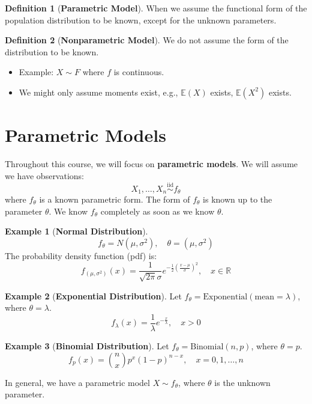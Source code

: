 \documentclass[12pt, a4paper]{article}
\theoremstyle{definition}
\newtheorem{definition}{Definition}
\newtheorem{example}{Example}
\newcommand{\R}{\mathbb{R}}
\newcommand{\E}{\mathbb{E}}
\newcommand{\iid}{\overset{\text{iid}}{\sim}}
\begin{document}
\begin{definition}[\textbf{Parametric Model}]
When we assume the functional form of the population distribution to be known, except for the unknown parameters.
\end{definition}

\begin{definition}[\textbf{Nonparametric Model}]
We do not assume the form of the distribution to be known.
\begin{itemize}
    \item Example: $X \sim F$ where $f$ is continuous.
    \item We might only assume moments exist, e.g., $\E(X)$ exists, $\E(X^2)$ exists.
\end{itemize}
\end{definition}

\section{Parametric Models}
Throughout this course, we will focus on \textbf{parametric models}. We will assume we have observations:
$$ X_1, \dots, X_n \iid f_\theta $$
where $f_\theta$ is a known parametric form. The form of $f_\theta$ is known up to the parameter $\theta$. We know $f_\theta$ completely as soon as we know $\theta$.

\begin{example}[\textbf{Normal Distribution}]
$$ f_\theta = N(\mu, \sigma^2), \quad \theta = (\mu, \sigma^2) $$
The probability density function (pdf) is:
$$ f_{(\mu, \sigma^2)}(x) = \frac{1}{\sqrt{2\pi}\sigma} e^{-\frac{1}{2}\left(\frac{x-\mu}{\sigma}\right)^2}, \quad x \in \R $$
\end{example}

\begin{example}[\textbf{Exponential Distribution}]
Let $f_\theta = \text{Exponential}(\text{mean} = \lambda)$, where $\theta = \lambda$.
$$ f_\lambda(x) = \frac{1}{\lambda} e^{-\frac{x}{\lambda}}, \quad x > 0 $$
\end{example}

\begin{example}[\textbf{Binomial Distribution}]
Let $f_\theta = \text{Binomial}(n, p)$, where $\theta = p$.
$$ f_p(x) = \binom{n}{x} p^x (1-p)^{n-x}, \quad x = 0, 1, \dots, n $$
\end{example}

In general, we have a parametric model $X \sim f_\theta$, where $\theta$ is the unknown parameter.
\end{document}

